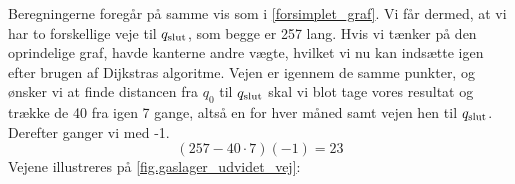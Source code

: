 Beregningerne foregår på samme vis som i \autoref{forsimplet_graf}. Vi får dermed, at vi har to forskellige veje til $q_{\textrm{slut}}$, som begge er 257 lang. Hvis vi tænker på den oprindelige graf, havde kanterne andre vægte, hvilket vi nu kan indsætte igen efter brugen af Dijkstras algoritme. Vejen er igennem de samme punkter, og ønsker vi at finde distancen fra $q_{0}$ til $q_{\textrm{slut}}$ skal vi blot tage vores resultat og trække de 40 fra igen 7 gange, altså en for hver måned samt vejen hen til $q_{\textrm{slut}}$. Derefter ganger vi med -1.
\begin{equation}
(257-40 \cdot 7)(-1) = 23
\end{equation}
Vejene illustreres på \autoref{fig.gaslager_udvidet_vej}:




